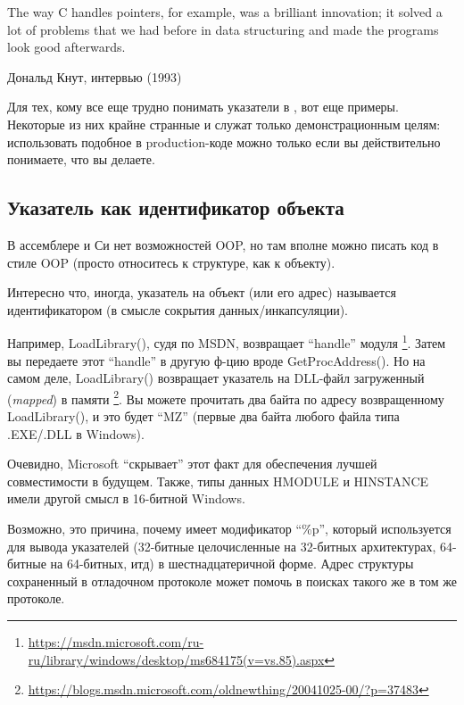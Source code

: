 \myindex{\CLanguageElements!\Pointers}
\label{label_pointers}

\epigraph{The way C handles pointers, for example, was a brilliant innovation;
it solved a lot of problems that we had before in data structuring and
made the programs look good afterwards.}{Дональд Кнут, интервью (1993)}

Для тех, кому все еще трудно понимать указатели в \CCpp{}, вот еще примеры.
Некоторые из них крайне странные и служат только демонстрационным целям:
использовать подобное в production-коде можно только если вы действительно понимаете, что вы делаете.








\subsection{Указатель как идентификатор объекта}

В ассемблере и Си нет возможностей \ac{OOP}, но там вполне можно писать код в стиле \ac{OOP}
(просто относитесь к структуре, как к объекту).

Интересно что, иногда, указатель на объект (или его адрес) называется идентификатором (в смысле сокрытия данных/инкапсуляции).

Например, LoadLibrary(), судя по \ac{MSDN}, возвращает ``handle'' модуля
\footnote{\url{https://msdn.microsoft.com/ru-ru/library/windows/desktop/ms684175(v=vs.85).aspx}}.
Затем вы передаете этот ``handle'' в другую ф-цию вроде GetProcAddress().
Но на самом деле, LoadLibrary() возвращает указатель на DLL-файл загруженный (\emph{mapped}) в памяти
\footnote{\url{https://blogs.msdn.microsoft.com/oldnewthing/20041025-00/?p=37483}}.
Вы можете прочитать два байта по адресу возвращенному LoadLibrary(), и это будет ``MZ'' (первые два байта любого файла
типа .EXE/.DLL в Windows).

Очевидно, Microsoft ``скрывает'' этот факт для обеспечения лучшей совместимости в будущем.
Также, типы данных HMODULE и HINSTANCE имели другой смысл в 16-битной Windows.

Возможно, это причина, почему \printf имеет модификатор ``\%p'', который используется для вывода указателей (32-битные
целочисленные на 32-битных архитектурах, 64-битные на 64-битных, итд) в шестнадцатеричной форме.
Адрес структуры сохраненный в отладочном протоколе может помочь в поисках такого же в том же протоколе.


